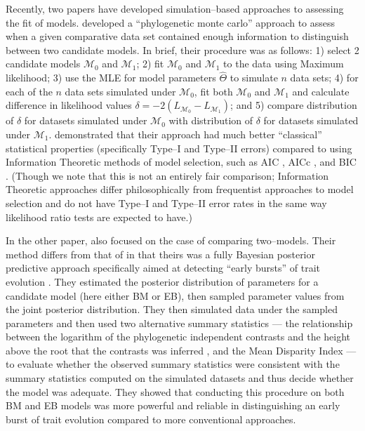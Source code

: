 \documentclass[a4paper,12pt]{article}
\begin{document}
Recently, two papers have developed simulation--based approaches to assessing the fit of models. \citet{Boettiger2012} developed a ``phylogenetic monte carlo'' approach to assess when a given comparative data set contained enough information to distinguish between two candidate models. In brief, their procedure was as follows: 1) select 2 candidate models $\mathcal{M}_0$ and $\mathcal{M}_1$; 2) fit $\mathcal{M}_0$ and $\mathcal{M}_1$ to the data using Maximum likelihood; 3) use the MLE for model parameters $\hat{\Theta}$ to simulate $n$ data sets; 4) for each of the $n$ data sets simulated under $\mathcal{M}_0$, fit both $\mathcal{M}_0$ and $\mathcal{M}_1$ and calculate difference in likelihood values $\delta = -2(L_{\mathcal{M}_0} - L_{\mathcal{M}_1})$; and 5) compare distribution of $\delta$ for datasets simulated under $\mathcal{M}_0$ with distribution of $\delta$ for datasets simulated under $\mathcal{M}_1$. \citet{Boettiger2012} demonstrated that their approach had much better ``classical'' statistical properties (specifically Type--I and Type--II errors) compared to using Information Theoretic methods of model selection, such as AIC \citep{Akaike1974}, AICc \citep{AICC}, and BIC \citep{Schwarz1978}. (Though we note that this is not an entirely fair comparison; Information Theoretic approaches differ philosophically from frequentist approaches to model selection  and do not have Type--I and Type--II error rates in the same way likelihood ratio tests \citep{Wilkes1938} are expected to have.)

In the other paper, \citet{SlaterPennell} also focused on the case of comparing two--models. Their method differs from that of \citet{Boettiger2012} in that theirs was a fully Bayesian posterior predictive approach specifically aimed at detecting ``early bursts'' of trait evolution \citep[\textit{sensu}][]{Simpson1944, Harmon2010}. They estimated the posterior distribution of parameters for a candidate model (here either BM or EB), then sampled parameter values from the joint posterior distribution. They then simulated data under the sampled parameters and then used two alternative summary statistics --- the relationship between the logarithm of the phylogenetic independent contrasts and the height above the root that the contrasts was inferred \citep[a.k.a. the ``node height test'';][]{FreckletonHarvey2006}, and the Mean Disparity Index \citep[MDI;][]{Harmon2003, Slater2010} --- to evaluate whether the observed summary statistics were consistent with the summary statistics computed on the simulated datasets and thus decide whether the model was adequate. They showed that conducting this procedure on both BM and EB models was more powerful and reliable in distinguishing an early burst of trait evolution compared to more conventional approaches.
\end{document}
